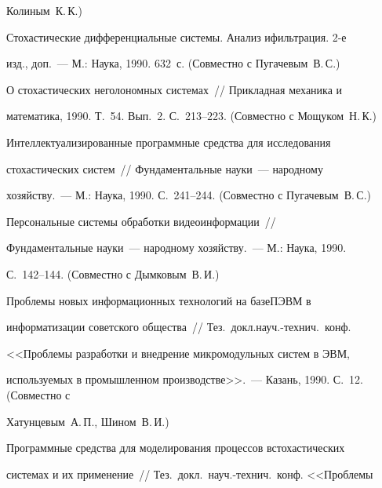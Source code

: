 Колиным~К.\,К.)










 Стохастические дифференциальные системы. Анализ и\linebreak фильтрация. 2-е


изд., доп.~--- М.: Наука, 1990. 632~с. (Совместно с Пугачевым~В.\,С.)





 О стохастических неголономных системах~// Прикладная механика и


математика, 1990. Т.~54. Вып.~2. С.~213--223. (Совместно с Мощуком~Н.\,К.)





 Интеллектуализированные программные средства для исследования


стохастических систем~// Фундаментальные науки~--- народному


хозяйству.~--- М.: Наука, 1990. С.~241--244. (Совместно с Пугачевым~В.\,С.)





 Персональные системы обработки видеоинформации~//


Фундаментальные науки~--- народному хозяйству.~--- М.: Наука, 1990.


С.~142--144. (Совместно с Дымковым~В.\,И.)





 Проблемы новых информационных технологий на базе\linebreak ПЭВМ в


информатизации советского общества~// Тез.\ докл.\linebreak науч.-тех\-нич.\ конф.\


<<Проблемы разработки и внедрение микромодульных систем в ЭВМ,


используемых в промышленном производстве>>.~--- Казань, 1990. С.~12. (Совместно с


Хатунцевым~А.\,П., Шином~В.\,И.)





 Программные средства для моделирования процессов в\linebreak стохастических


системах и их применение~// Тез.\ докл.\ науч.-тех\-нич.\ конф. <<Проблемы


